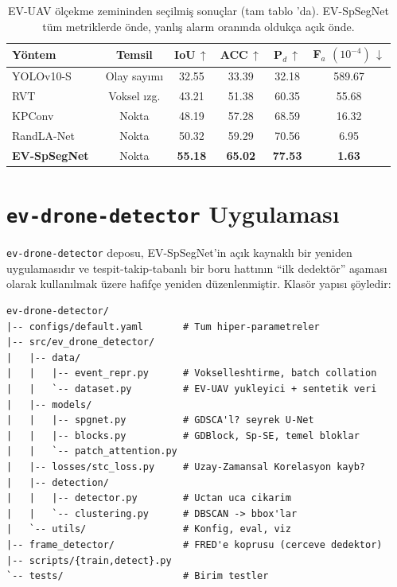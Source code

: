 \documentclass[11pt,a4paper]{article}
\begin{document}
\begin{table}[t]
  \centering
  \small
  \begin{tabular}{lccccc}
    \toprule
    Y\"ontem & Temsil & IoU\,$\uparrow$ & ACC\,$\uparrow$ &
    P$_d$\,$\uparrow$ & F$_a$ $(10^{-4})$\,$\downarrow$ \\
    \midrule
    YOLOv10-S~\cite{chen2025evspsegnet}   & Olay say{\i}m{\i} & 32.55 & 33.39 & 32.18 & 589.67 \\
    RVT~\cite{gehrig2023rvt}              & Voksel {\i}zg.    & 43.21 & 51.38 & 60.35 &  55.68 \\
    KPConv~\cite{thomas2019kpconv}        & Nokta             & 48.19 & 57.28 & 68.59 &  16.32 \\
    RandLA-Net~\cite{hu2020randla}        & Nokta             & 50.32 & 59.29 & 70.56 &   6.95 \\
    \textbf{EV-SpSegNet}~\cite{chen2025evspsegnet}
                                          & Nokta             & \textbf{55.18} & \textbf{65.02} & \textbf{77.53} & \textbf{1.63} \\
    \bottomrule
  \end{tabular}
  \caption{EV-UAV \"ol\c{c}ekme zemininden se\c{c}ilmi\c{s}
           sonu\c{c}lar (tam tablo
           \cite[Tab.~2]{chen2025evspsegnet}'da). EV-SpSegNet t\"um
           metriklerde \"onde, yanl{\i}\c{s} alarm oran{\i}nda
           olduk\c{c}a a\c{c}{\i}k \"onde.}
  \label{tab:bench}
\end{table}

\section{\texttt{ev-drone-detector} Uygulamas{\i}}
\texttt{ev-drone-detector} deposu, EV-SpSegNet'in a\c{c}{\i}k
kaynakl{\i} bir yeniden uygulamas{\i}d{\i}r ve tespit-takip-tabanl{\i}
bir boru hatt{\i}n{\i}n ``ilk dedekt\"or'' a\c{s}amas{\i} olarak
kullan{\i}lmak \"uzere hafif\c{c}e yeniden d\"uzenlenmi\c{s}tir.
Klas\"or yap{\i}s{\i} \c{s}\"oyledir:

\begin{lstlisting}[basicstyle=\ttfamily\footnotesize]
ev-drone-detector/
|-- configs/default.yaml       # Tum hiper-parametreler
|-- src/ev_drone_detector/
|   |-- data/
|   |   |-- event_repr.py      # Vokselleshtirme, batch collation
|   |   `-- dataset.py         # EV-UAV yukleyici + sentetik veri
|   |-- models/
|   |   |-- spgnet.py          # GDSCA'l? seyrek U-Net
|   |   |-- blocks.py          # GDBlock, Sp-SE, temel bloklar
|   |   `-- patch_attention.py
|   |-- losses/stc_loss.py     # Uzay-Zamansal Korelasyon kayb?
|   |-- detection/
|   |   |-- detector.py        # Uctan uca cikarim
|   |   `-- clustering.py      # DBSCAN -> bbox'lar
|   `-- utils/                 # Konfig, eval, viz
|-- frame_detector/            # FRED'e koprusu (cerceve dedektor)
|-- scripts/{train,detect}.py
`-- tests/                     # Birim testler
\end{lstlisting}
\end{document}
